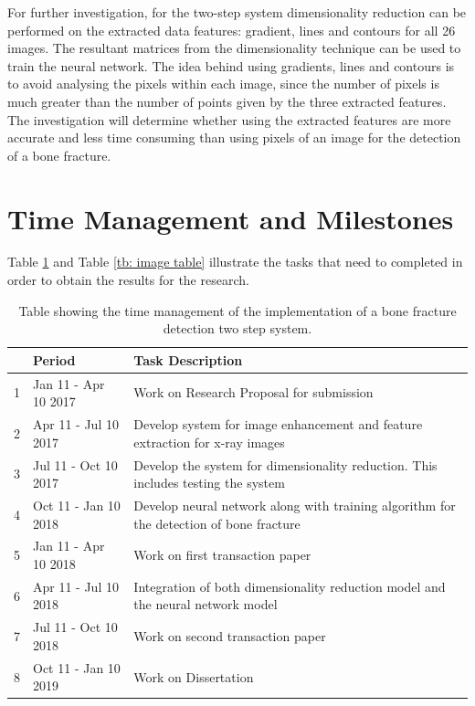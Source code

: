 \documentclass[11pt,twocolumn]{witseiepaper}
\begin{document}
	For further investigation, for the two-step system dimensionality reduction can be performed on the extracted data features: gradient, lines and contours for all 26 images. The resultant matrices from the dimensionality technique can be used to train the neural network. The idea behind using gradients, lines and contours is to avoid analysing the pixels within each image, since the number of pixels is much greater than the number of points given by the three extracted features. The investigation will determine whether using the extracted features are more accurate and less time consuming than using pixels of an image for the detection of a bone fracture.
	
	\section{Time Management and Milestones}
	Table \ref{time_management} and Table \ref{tb: image table} illustrate the tasks that need to completed in order to obtain the results for the research.
	\begin{table}[!h]
		\centering
		\caption{Table showing the time management of the implementation of a bone fracture detection two step system.}
		\label{time_management}
		\begin{tabular}{| c | p{2.5cm} | p{4.5cm} |}
			\hline
			& Period & Task Description \\
			\hline \hline
			1 & Jan 11 - Apr 10 2017 & Work on Research Proposal for submission\\
			\hline
			2 & Apr 11 - Jul 10 2017 & Develop system for image enhancement and feature extraction for x-ray images \\
			\hline
			3 & Jul 11 - Oct 10 2017 &  Develop the system for dimensionality reduction. This includes testing the system\\
			\hline
			4 & Oct 11 - Jan 10 2018 & Develop neural network along with training algorithm for the detection of bone fracture \\
			\hline
			5 & Jan 11 - Apr 10 2018 & Work on first transaction paper \\
			\hline
			6 & Apr 11 - Jul 10 2018 & Integration of both dimensionality reduction model and the neural network model \\
			\hline
			7 & Jul 11 - Oct 10 2018 & Work on second transaction paper\\
			\hline
			8 & Oct 11 - Jan 10 2019 & Work on Dissertation \\
			\hline
		\end{tabular}
	\end{table}
	
\end{document}
